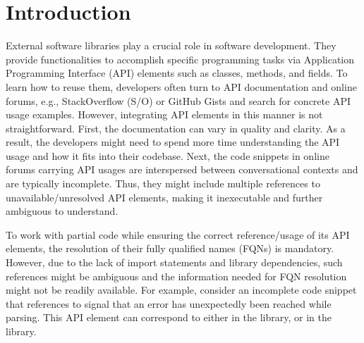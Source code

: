 \section{Introduction}
\label{sec:intro}
External software libraries play a crucial role in software development. They provide functionalities to accomplish specific programming tasks via Application Programming Interface (API) elements such as classes, methods, and fields. To learn how to reuse them, developers often turn to API documentation and online forums, e.g., StackOverflow (S/O) or GitHub Gists and search for concrete API usage examples. However, integrating API elements in this manner is not straightforward. First, the documentation can vary in quality and clarity. As a result, the developers might need to spend more time understanding the API usage and how it fits into their codebase. Next, the code snippets in online forums carrying API usages are interspersed between conversational contexts and are typically incomplete. Thus, they might include multiple references to unavailable/unresolved API elements, making it inexecutable and further ambiguous to understand.

To work with partial code while ensuring the correct reference/usage of its API elements, the resolution of their fully qualified names (FQNs) is mandatory. However, due to the lack of import statements and library dependencies, such references might be ambiguous and the information needed for FQN resolution might not be readily available. For example, consider an incomplete code snippet that references  to signal that an error has unexpectedly been reached while parsing. This API element can correspond to either  in the  library, or  in the  library.

